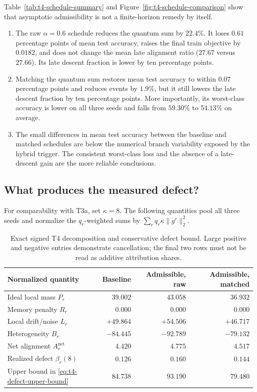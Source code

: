 Table~\ref{tab:t4-schedule-summary} and
Figure~\ref{fig:t4-schedule-comparison} show that asymptotic admissibility is
not a finite-horizon remedy by itself.
\begin{enumerate}
    \item The raw $\alpha=0.6$ schedule reduces the quantum sum by $22.4\%$.
    It loses $0.61$ percentage points of mean test accuracy, raises the final
    train objective by $0.0182$, and does not change the mean late alignment
    ratio ($27.67$ versus $27.66$).  Its late descent fraction is lower by ten
    percentage points.
    \item Matching the quantum sum restores mean test accuracy to within
    $0.07$ percentage points and reduces events by $1.9\%$, but it still lowers
    the late descent fraction by ten percentage points.  More importantly, its
    worst-class accuracy is lower on all three seeds and falls from $59.30\%$
    to $54.13\%$ on average.
    \item The small differences in mean test accuracy between the baseline and
    matched schedules are below the numerical branch variability exposed by
    the hybrid trigger.  The consistent worst-class loss and the absence of a
    late-descent gain are the more reliable conclusions.
\end{enumerate}

\subsection{What produces the measured defect?}

For comparability with T3a, set $\kappa=8$.  The following quantities pool all
three seeds and normalize the $q_r$-weighted sums by
$\sum_rq_r\kappa\|g^r\|_2^2$.

\begin{table}[H]
\centering
\caption{Exact signed T4 decomposition and conservative defect bound.  Large
positive and negative entries demonstrate cancellation; the final two rows
must not be read as additive attribution shares.}
\label{tab:t4-defect-decomposition}
\begin{tabular}{lrrr}
\toprule
Normalized quantity & Baseline & Admissible, raw & Admissible, matched\\
\midrule
Ideal local mass $P_r$ & $39.002$ & $43.058$ & $36.932$\\
Memory penalty $R_r$ & $0.000$ & $0.000$ & $0.000$\\
Local drift/noise $L_r$ & $+49.864$ & $+54.506$ & $+46.717$\\
Heterogeneity $B_r$ & $-84.445$ & $-92.789$ & $-79.132$\\
Net alignment $A_r^{\mathrm{net}}$ & $4.420$ & $4.775$ & $4.517$\\
\midrule
Realized defect $\beta_r(8)$ & $0.126$ & $0.160$ & $0.144$\\
Upper bound in \eqref{eq:t4-defect-upper-bound} & $84.738$ & $93.190$ & $79.480$\\
\bottomrule
\end{tabular}
\end{table}

